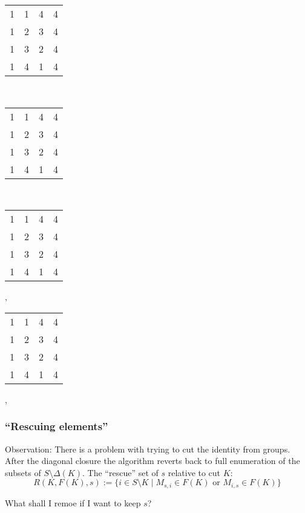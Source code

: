 \documentclass{beamer}
\newcommand{\jump}{\vskip6pt}
\newcommand{\jmp}{\vskip3pt}
\begin{document}
\begin{frame}
\begin{center}
\begin{tabular}{@{}c@{}c@{}c@{}c@{}}
1&\color{lgr}1&\color{lgr}4&4\\
\color{lgr}1&\color{lgr}2&\color{lgr}3&\color{lgr}4\\
\color{lgr}1&\color{lgr}3&\color{lgr}2&\color{lgr}4\\
1&\color{lgr}4&\color{lgr}1&4\\
\end{tabular}\\\jmp 
\begin{tabular}{@{}c@{}c@{}c@{}c@{}}
\color{lgr}1&\color{lgr}1&\color{lgr}4&\color{lgr}4\\
\color{lgr}1&2&\color{lgr}3&\color{lgr}4\\
\color{lgr}1&\color{lgr}3&\color{lgr}2&\color{lgr}4\\
\color{lgr}1&\color{lgr}4&\color{lgr}1&\color{lgr}4\\
\end{tabular}\ \ \ \ \ \ \ \ \ \ \ \ \ 
\begin{tabular}{@{}c@{}c@{}c@{}c@{}}
1&\color{lgr}1&\color{lgr}4&\color{lgr}4\\
\color{lgr}1&\color{lgr}2&\color{lgr}3&\color{lgr}4\\
\color{lgr}1&\color{lgr}3&\color{lgr}2&\color{lgr}4\\
\color{lgr}1&\color{lgr}4&\color{lgr}1&\color{lgr}4\\
\end{tabular},\ \ \ 
\begin{tabular}{@{}c@{}c@{}c@{}c@{}}
\color{lgr}1&\color{lgr}1&\color{lgr}4&\color{lgr}4\\
\color{lgr}1&\color{lgr}2&\color{lgr}3&\color{lgr}4\\
\color{lgr}1&\color{lgr}3&\color{lgr}2&\color{lgr}4\\
\color{lgr}1&\color{lgr}4&\color{lgr}1&4\\
\end{tabular},\ \ \ 


\end{center}
\end{frame}


\begin{frame}\frametitle{``Rescuing elements''}
Observation: There is a problem with trying to cut the identity from groups. After the diagonal closure the algorithm reverts back to full enumeration of the subsets of $S\setminus \Delta(K)$.
\jump
The ``rescue'' set of $s$ relative to cut $K$:
$$ R(K,F(K),s):=\{i\in S\setminus K\mid M_{s,i}\in F(K) \text{ or } M_{i,s}\in F(K)\}$$

What shall I remoe if I want to keep $s$?

\end{frame}
\end{document}
